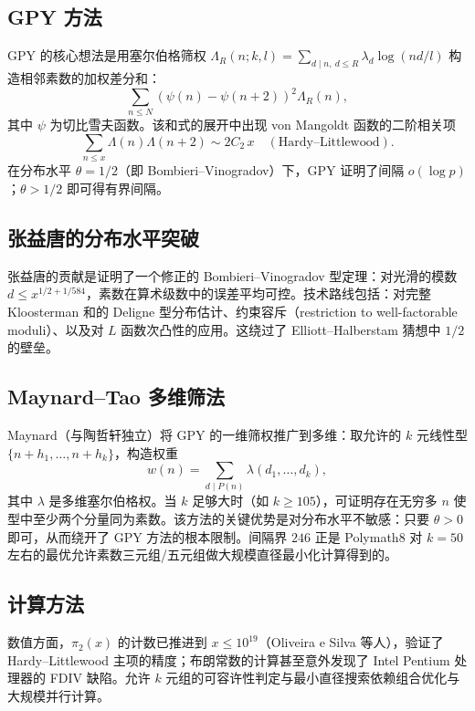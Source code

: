 \subsection{GPY 方法}

GPY 的核心想法是用塞尔伯格筛权 $\Lambda_R(n; k, l) = \sum_{d \mid n,\ d \le R} \lambda_d \log(nd/l)$ 构造相邻素数的加权差分和\cite{goldston2009primes}：
\begin{equation}
    \sum_{n \le N} \left(\psi(n) - \psi(n+2)\right)^2 \Lambda_R(n),
\end{equation}
其中 $\psi$ 为切比雪夫函数。该和式的展开中出现 von Mangoldt 函数的二阶相关项
\begin{equation}
    \sum_{n \le x} \Lambda(n) \Lambda(n+2) \sim 2 C_2\, x \quad (\text{Hardy--Littlewood}).
\end{equation}
在分布水平 $\theta = 1/2$（即 Bombieri--Vinogradov）下，GPY 证明了间隔 $o(\log p)$；$\theta > 1/2$ 即可得有界间隔。

\subsection{张益唐的分布水平突破}

张益唐的贡献是证明了一个修正的 Bombieri--Vinogradov 型定理\cite{zhang2014bounded}：对光滑的模数 $d \le x^{1/2 + 1/584}$，素数在算术级数中的误差平均可控。技术路线包括：对完整 Kloosterman 和的 Deligne 型分布估计、约束容斥（restriction to well-factorable moduli）、以及对 $L$ 函数次凸性的应用。这绕过了 Elliott--Halberstam 猜想中 $1/2$ 的壁垒。

\subsection{Maynard--Tao 多维筛法}

Maynard（与陶哲轩独立）将 GPY 的一维筛权推广到多维\cite{maynard2015small}：取允许的 $k$ 元线性型 $\{n + h_1, \ldots, n + h_k\}$，构造权重
\begin{equation}
    w(n) = \sum_{d \mid P(n)} \lambda(d_1, \ldots, d_k),
\end{equation}
其中 $\lambda$ 是多维塞尔伯格权。当 $k$ 足够大时（如 $k \ge 105$），可证明存在无穷多 $n$ 使型中至少两个分量同为素数。该方法的关键优势是对分布水平不敏感：只要 $\theta > 0$ 即可，从而绕开了 GPY 方法的根本限制。间隔界 $246$ 正是 Polymath8 对 $k=50$ 左右的最优允许素数三元组/五元组做大规模直径最小化计算得到的\cite{polymath2014variants}。

\subsection{计算方法}

数值方面，$\pi_2(x)$ 的计数已推进到 $x \le 10^{19}$（Oliveira e Silva 等人），验证了 Hardy--Littlewood 主项的精度；布朗常数的计算甚至意外发现了 Intel Pentium 处理器的 FDIV 缺陷\cite{nicely1995enumeration}。允许 $k$ 元组的可容许性判定与最小直径搜索依赖组合优化与大规模并行计算。
